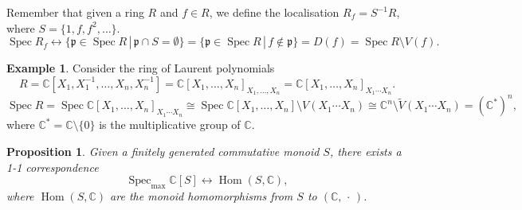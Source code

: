 \documentclass[12pt]{article}
\newtheorem*{proposition}{Proposition}
\theoremstyle{definition}
\newtheorem*{example}{Example}
\DeclareMathOperator{\Hom}{Hom}
\DeclareMathOperator{\Spec}{Spec}
\begin{document}
Remember that given a ring $R$ and $f\in R$, we define the localisation $R_f=S^{-1}R$, where $S=\{1,f,f^2,\ldots\}$.
\[\Spec R_f\longleftrightarrow\{\mathfrak{p}\in\Spec R\,|\,\mathfrak{p}\cap S=\emptyset\}=\{\mathfrak{p}\in\Spec R\,|\,f\notin\mathfrak{p}\}=D(f)=\Spec R\setminus V(f).\]

\begin{example}
Consider the ring of Laurent polynomials
\[R=\mathbb{C}[X_1,X_1^{-1},\ldots,X_n,X_n^{-1}]=\mathbb{C}[X_1,\ldots,X_n]_{X_1,\ldots,X_n}=\mathbb{C}[X_1,\ldots,X_n]_{X_1\cdots X_n}.\]
\[\Spec R=\Spec\mathbb{C}[X_1,\ldots,X_n]_{X_1\cdots X_n}\cong\Spec\mathbb{C}[X_1,\ldots,X_n]\setminus V(X_1\cdots X_n)\cong\mathbb{C}^n\setminus\widetilde{V}(X_1\cdots X_n)=(\mathbb{C}^*)^n,\]
where $\mathbb{C}^*=\mathbb{C}\setminus\{0\}$ is the multiplicative group of $\mathbb{C}$.
\end{example}

\begin{proposition}
Given a finitely generated commutative monoid $S$, there exists a 1-1 correspondence
\[\Spec_{\text{max}}\mathbb{C}[S]\longleftrightarrow\Hom(S,\mathbb{C}),\]
where $\Hom(S,\mathbb{C})$ are the monoid homomorphisms from $S$ to $(\mathbb{C},\,\cdot\,)$.
\end{proposition}
\end{document}
